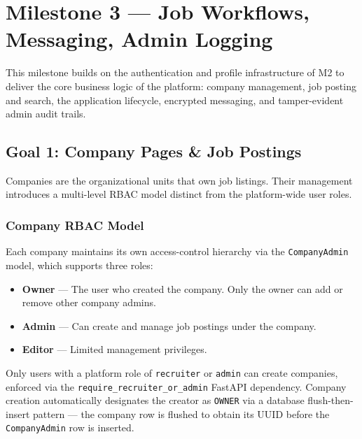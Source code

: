 
\section{Milestone 3 — Job Workflows, Messaging, Admin Logging}
\label{sec:milestone3}

This milestone builds on the authentication and profile infrastructure of M2 to deliver the core business logic of the platform: company management, job posting and search, the application lifecycle, encrypted messaging, and tamper-evident admin audit trails.

\subsection{Goal 1: Company Pages \& Job Postings}

Companies are the organizational units that own job listings. Their management introduces a multi-level RBAC model distinct from the platform-wide user roles.

\subsubsection{Company RBAC Model}

Each company maintains its own access-control hierarchy via the \texttt{CompanyAdmin} model, which supports three roles:

\begin{itemize}
    \item \textbf{Owner} — The user who created the company. Only the owner can add or remove other company admins.
    \item \textbf{Admin} — Can create and manage job postings under the company.
    \item \textbf{Editor} — Limited management privileges.
\end{itemize}

Only users with a platform role of \texttt{recruiter} or \texttt{admin} can create companies, enforced via the \texttt{require\_recruiter\_or\_admin} FastAPI dependency. Company creation automatically designates the creator as \texttt{OWNER} via a database flush-then-insert pattern — the company row is flushed to obtain its UUID before the \texttt{CompanyAdmin} row is inserted.

